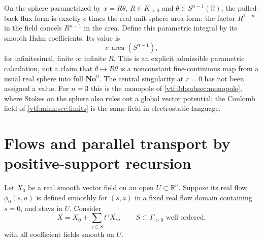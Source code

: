 \documentclass[11pt,letterpaper]{article}
\theoremstyle{definition}
\theoremstyle{remark}
\newcommand{\No}{\mathbf{No}}
\newcommand{\R}{\mathbb R}\newcommand{\C}{\mathbb C}
\begin{document}
On the sphere parametrized by $x=R\theta$, $R\in K_{>0}$ and
$\theta\in S^{n-1}(\R)$, the pulled-back flux form is exactly
$c$ times the real unit-sphere area form: the factor $R^{1-n}$ in the field
cancels $R^{n-1}$ in the area. Define this parametric integral by its smooth
Hahn coefficients. Its value is
\[
 c\,\operatorname{area}(S^{n-1}),
\]
for infinitesimal, finite or infinite $R$. This is an explicit admissible
parametric calculation, not a claim that $\theta\mapsto R\theta$ is a
nonconstant fine-continuous map from a usual real sphere into full $\No^n$.
The central singularity at $r=0$ has not been assigned a value. For $n=3$ this
is the monopole of \cref{vtf:3d:subsec:monopole}, where Stokes on the sphere
also rules out a global vector potential; the Coulomb field of
\cref{vtf:mink:sec:limits} is the same field in electrostatic language.

\section{Flows and parallel transport by positive-support recursion}\label{vtf:sec:flows}

Let $X_0$ be a real smooth vector field on an open $U\subset\R^n$. Suppose
its real flow $\phi_0(s,a)$ is defined smoothly for $(s,a)$ in a fixed real
flow domain containing $s=0$, and stays in $U$. Consider
\[
 X=X_0+\sum_{\gamma\in S}t^\gamma X_\gamma,
 \qquad S\subset\Gamma_{>0}\text{ well ordered},
\]
with all coefficient fields smooth on $U$.
\end{document}
